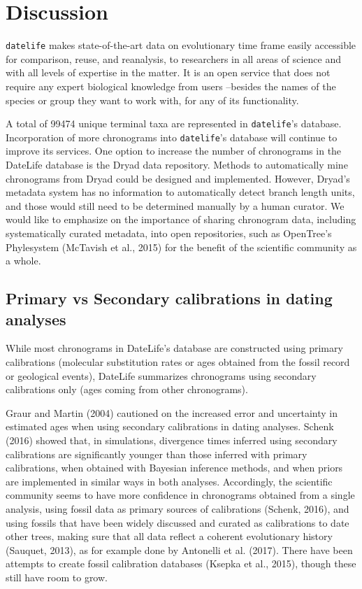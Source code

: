 \documentclass[
  man]{apa6}
\begin{document}
\hypertarget{discussion}{%
\section{Discussion}\label{discussion}}

\texttt{datelife} makes state-of-the-art data on evolutionary time frame easily accessible for comparison, reuse, and reanalysis, to researchers in all areas of science and with all levels of expertise in the matter. It is an open service that does not require any expert biological knowledge from users --besides the names of the species or group they want to work with, for any of its functionality.

A total of 99474 unique terminal taxa are represented in \texttt{datelife}'s database.
Incorporation of more chronograms into \texttt{datelife}'s database will continue to improve its services. One option to increase the number of chronograms in the DateLife database is the Dryad data repository. Methods to automatically mine chronograms from Dryad could be designed and implemented. However, Dryad's metadata system has no information to automatically detect branch length units, and those would still need to be determined manually by a human curator.
We would like to emphasize on the importance of sharing chronogram data, including systematically curated metadata, into open repositories, such as OpenTree's Phylesystem (McTavish et al., 2015) for the benefit of the scientific community as a whole.

\hypertarget{primary-vs-secondary-calibrations-in-dating-analyses}{%
\subsection{Primary vs Secondary calibrations in dating analyses}\label{primary-vs-secondary-calibrations-in-dating-analyses}}

While most chronograms in DateLife's database are constructed using primary calibrations (molecular substitution rates or ages obtained from the fossil record or geological events), DateLife summarizes chronograms using secondary calibrations only (ages coming from other chronograms).

Graur and Martin (2004) cautioned on the increased error and uncertainty in estimated ages when using secondary calibrations in dating analyses.
Schenk (2016) showed that, in simulations, divergence times inferred using secondary calibrations are significantly younger than those inferred with primary calibrations, when obtained with Bayesian inference methods, and when priors are implemented in similar ways in both analyses.
Accordingly, the scientific community seems to have more confidence in chronograms obtained from a single analysis, using fossil data as primary sources of calibrations (Schenk, 2016), and using fossils that have been widely discussed and curated as calibrations to date other trees, making sure that all data reflect a coherent evolutionary history (Sauquet, 2013), as for example done by Antonelli et al. (2017).
There have been attempts to create fossil calibration databases (Ksepka et al., 2015), though these still have room to grow.
\end{document}
